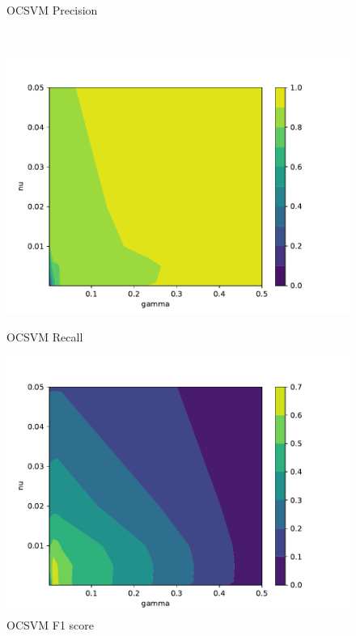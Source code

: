 \begin{figure}[!htb]
\begin{minipage}[t]{0.5\textwidth}
        \caption{OCSVM Precision}
    \end{minipage}
    \\
    \begin{minipage}[t]{0.5\textwidth}
        \vspace{0pt}
        \includegraphics[width=\textwidth]{images/ocsvm-recall.pdf}
        \caption{OCSVM Recall}
    \end{minipage}
    \hfill
    \begin{minipage}[t]{0.5\textwidth}
        \vspace{0pt}
        \includegraphics[width=\textwidth]{images/ocsvm-f1.pdf}
        \caption{OCSVM F1 score}
    \end{minipage}
\end{figure}

